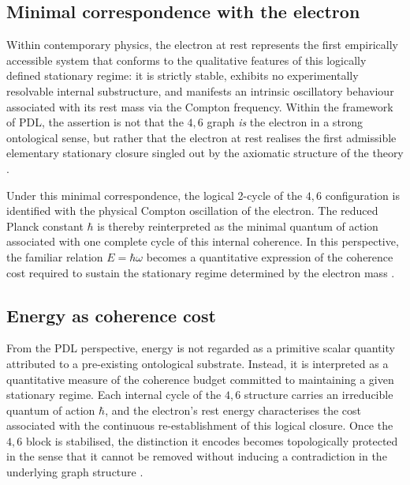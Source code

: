 \documentclass{article}
\begin{document}
\subsection{Minimal correspondence with the electron}
\label{subsec:electron_correspondence}

Within contemporary physics, the electron at rest represents the first empirically accessible system that conforms to the qualitative features of this logically defined stationary regime: it is strictly stable, exhibits no experimentally resolvable internal substructure, and manifests an intrinsic oscillatory behaviour associated with its rest mass via the Compton frequency. Within the framework of PDL, the assertion is not that the \(4,6\) graph \emph{is} the electron in a strong ontological sense, but rather that the electron at rest realises the first admissible elementary stationary closure singled out by the axiomatic structure of the theory \citep{PDL_Main_2026,PDL_intro}.

Under this minimal correspondence, the logical 2-cycle of the \(4,6\) configuration is identified with the physical Compton oscillation of the electron. The reduced Planck constant \(\hbar\) is thereby reinterpreted as the minimal quantum of action associated with one complete cycle of this internal coherence. In this perspective, the familiar relation \(E = \hbar \omega\) becomes a quantitative expression of the coherence cost required to sustain the stationary regime determined by the electron mass \citep{PDL_Main_2026}.

\subsection{Energy as coherence cost}
\label{subsec:energy_coherence}

From the PDL perspective, energy is not regarded as a primitive scalar quantity attributed to a pre-existing ontological substrate. Instead, it is interpreted as a quantitative measure of the coherence budget committed to maintaining a given stationary regime. Each internal cycle of the \(4,6\) structure carries an irreducible quantum of action \(\hbar\), and the electron’s rest energy characterises the cost associated with the continuous re-establishment of this logical closure. Once the \(4,6\) block is stabilised, the distinction it encodes becomes topologically protected in the sense that it cannot be removed without inducing a contradiction in the underlying graph structure \citep{PDL_Main_2026,PDL_intro}.
\end{document}
